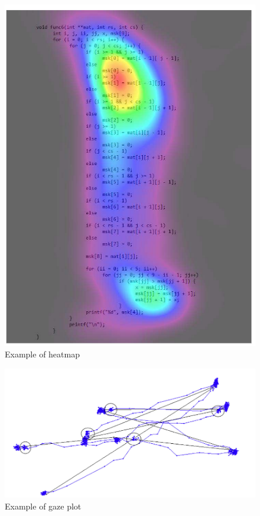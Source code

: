 \begin{figure} [H]
  \centering
  \includegraphics[scale=1.2]{figures/hm.png}
  \caption{Example of heatmap \cite{jbara2017programmers}}
  \label{fig:AnhangsChor}
\end{figure}


\begin{figure} [H]
  \centering
  \includegraphics[scale=1]{figures/gaze.png}
  \caption{Example of gaze plot \cite{blignaut2019visualization}}
  \label{fig:AnhangsChor}
\end{figure}

